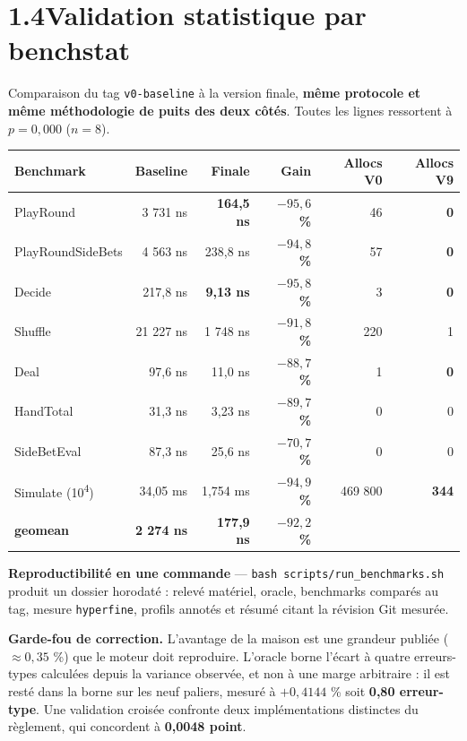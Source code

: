 \documentclass[10pt,a4paper]{article}
\newcommand{\gain}[1]{{\color{good}\bfseries #1}}
\newcommand{\code}[1]{\texttt{\small #1}}
\begin{document}
\section{1.4\quad Validation statistique par benchstat}

Comparaison du tag \code{v0-baseline} à la version finale, \textbf{même protocole et même
méthodologie de puits des deux côtés}. Toutes les lignes ressortent à $p = 0{,}000$
($n = 8$).

\vspace{2pt}
\begin{tabularx}{\textwidth}{@{}>{\small\ttfamily}l >{\small}r >{\small}r >{\small}r >{\small}r >{\small}r@{}}
\toprule
\textbf{\small Benchmark} & \textbf{\small Baseline} & \textbf{\small Finale} & \textbf{\small Gain} & \textbf{\small Allocs V0} & \textbf{\small Allocs V9}\\
\midrule
PlayRound        & 3 731 ns  & \textbf{164,5 ns} & \gain{$-95{,}6$ \%} & 46 & \gain{0}\\
PlayRoundSideBets& 4 563 ns  & 238,8 ns & \gain{$-94{,}8$ \%} & 57 & \gain{0}\\
Decide           & 217,8 ns  & \textbf{9,13 ns} & \gain{$-95{,}8$ \%} & 3 & \gain{0}\\
Shuffle          & 21 227 ns & 1 748 ns & \gain{$-91{,}8$ \%} & 220 & 1\\
Deal             & 97,6 ns   & 11,0 ns  & \gain{$-88{,}7$ \%} & 1 & \gain{0}\\
HandTotal        & 31,3 ns   & 3,23 ns  & \gain{$-89{,}7$ \%} & 0 & 0\\
SideBetEval      & 87,3 ns   & 25,6 ns  & \gain{$-70{,}7$ \%} & 0 & 0\\
Simulate (10\textsuperscript{4}) & 34,05 ms & 1,754 ms & \gain{$-94{,}9$ \%} & 469 800 & \gain{344}\\
\midrule
\textbf{geomean} & \textbf{2 274 ns} & \textbf{177,9 ns} & \gain{\textbf{$-92{,}2$ \%}} & & \\
\bottomrule
\end{tabularx}

\vspace{3pt}
\textbf{Reproductibilité en une commande} — \code{bash scripts/run\_benchmarks.sh} produit
un dossier horodaté : relevé matériel, oracle, benchmarks comparés au tag, mesure
\code{hyperfine}, profils annotés et résumé citant la révision Git mesurée.

\textbf{Garde-fou de correction.} L'avantage de la maison est une grandeur publiée
($\approx 0{,}35$ \%) que le moteur doit reproduire. L'oracle borne l'écart à quatre
erreurs-types calculées depuis la variance observée, et non à une marge arbitraire : il
est resté dans la borne sur les neuf paliers, mesuré à $+0{,}4144$ \% soit
\textbf{0,80 erreur-type}. Une validation croisée confronte deux implémentations
distinctes du règlement, qui concordent à \textbf{0,0048 point}.
\end{document}
